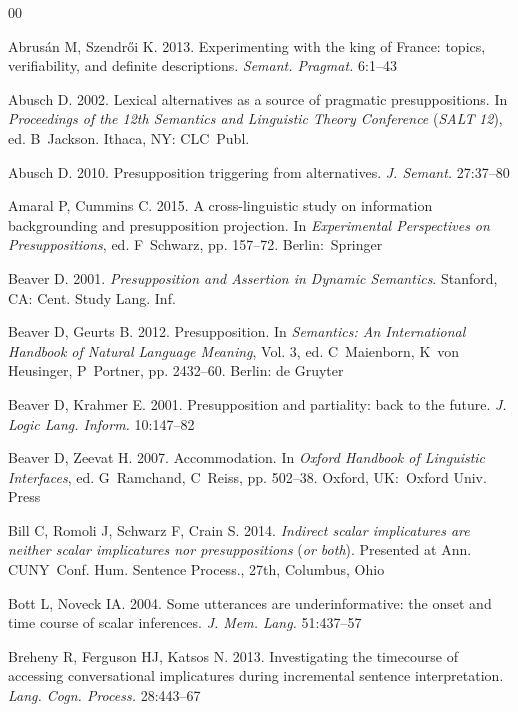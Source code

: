 \documentclass{ar-1col}
\begin{document}
\begin{thebibliography}{00}

Abrus\'an M, Szendr\H{o}i K. 2013. Experimenting with the king of
{F}rance: topics, verifiability, and definite descriptions.
\textit{Semant. Pragmat.} 6:1--43

Abusch D. 2002. Lexical alternatives as a source of pragmatic presuppositions. In \textit{Proceedings of the 12th Semantics and Linguistic Theory Conference}
({\textit{SALT}} \textit{12}), ed. B~Jackson. Ithaca, NY: CLC\ Publ.

Abusch D. 2010. Presupposition triggering from alternatives.
\textit{J. Semant.} 27:37--80

Amaral P, Cummins C. 2015. A cross-linguistic study on information backgrounding and presupposition projection. In \textit{Experimental Perspectives on
Presuppositions}, ed. F~Schwarz, pp. 157--72. Berlin:\ Springer


Beaver D. 2001. {\it Presupposition and Assertion in Dynamic
Semantics}. Stanford, CA: Cent. Study Lang. Inf.

Beaver D, Geurts B. 2012. Presupposition. In \textit{Semantics: An International
Handbook of Natural Language Meaning}, Vol. 3, ed. C~Maienborn,
K~{von Heusinger}, P~Portner, pp. 2432--60. Berlin: de
Gruyter

Beaver D, Krahmer E. 2001. Presupposition and partiality: back to
the future. \textit{J. Logic Lang. Inform.} 10:147--82

Beaver D, Zeevat H. 2007. Accommodation. In \textit{Oxford Handbook of Linguistic
Interfaces}, ed. G~Ramchand, C~Reiss, pp. 502--38. Oxford, UK:\ Oxford
Univ. Press

Bill C, Romoli J, Schwarz F, Crain S. 2014. \textit{Indirect scalar
implicatures are neither scalar implicatures nor presuppositions}
(\textit{or both}). Presented at Ann. CUNY\ Conf. Hum. Sentence Process., 27th, Columbus, Ohio

Bott L, Noveck IA. 2004. Some utterances are underinformative: the
onset and time course of scalar inferences. \textit{J. Mem. Lang.}
51:437--57

Breheny R, Ferguson HJ, Katsos N. 2013. Investigating the
timecourse of accessing conversational implicatures during
incremental sentence interpretation. \textit{Lang. Cogn. Process.}
28:443--67




\end{thebibliography}
\end{document}
